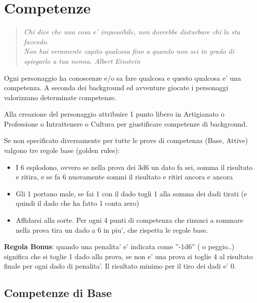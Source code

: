\documentclass[a4paper,11pt,twoside,openany]{book}
\begin{document}
\pagebreak

\section{Competenze}

\label{competenze}
\begin{quote}\textit{
Chi dice che una cosa e' impossibile, non dovrebbe disturbare chi la sta facendo.\\
Non hai veramente capito qualcosa fino a quando non sei in grado di spiegarlo a tua nonna. Albert Einstein}\end{quote}


Ogni personaggio ha conoscenze e/o sa fare qualcosa e questo qualcosa e' una competenza. A seconda dei background ed avventure giocate i personaggi valorizzano determinate competenze.

Alla creazione del personaggio attribuire 1 punto libero in Artigianato o Professione o Intrattenere o Cultura per giustificare competenze di background.

Se non specificato diversamente per tutte le prove di competenza (Base, Attive) valgono tre regole base (golden rules):

\begin{itemize}
\item 
I 6 esplodono, ovvero se nella prova dei 3d6 un dato fa sei, somma
il risultato e ritira, e se fa 6 nuovamente sommi il risultato e ritiri
ancora e ancora 
\item 
Gli 1 portano male, se fai 1 con il dado togli 1 alla somma dei dadi
tirati (e quindi il dado che ha fatto 1 conta zero) 
\item 
Affidarsi alla sorte. Per ogni 4 punti di competenza che rinunci a
sommare nella prova tira un dado a 6 in piu', che rispetta le regole
base. 
\end{itemize}

\textbf{Regola Bonus}: quando una penalita' e' indicata come ''-1d6'' ( o peggio..) significa che si toglie 1 dado alla prova, se non e' una prova si toglie 4 al risultato finale per ogni dado di penalita'. Il risultato minimo per il tiro dei dadi e' 0.


\subsection{Competenze di Base}

\label{competenze-di-base}
\end{document}
